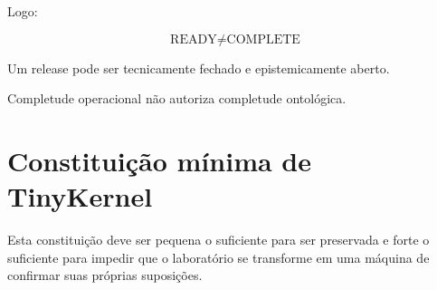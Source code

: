 \documentclass[11pt,a4paper]{article}
\begin{document}
Logo:

\[
\boxed{\text{READY}\neq\text{COMPLETE}}
\]

\begin{thesisbox}
Um release pode ser tecnicamente fechado e epistemicamente aberto.

Completude operacional não autoriza completude ontológica.
\end{thesisbox}

\section{Constituição mínima de TinyKernel}

Esta constituição deve ser pequena o suficiente para ser preservada e forte o
suficiente para impedir que o laboratório se transforme em uma máquina de confirmar
suas próprias suposições.
\end{document}
